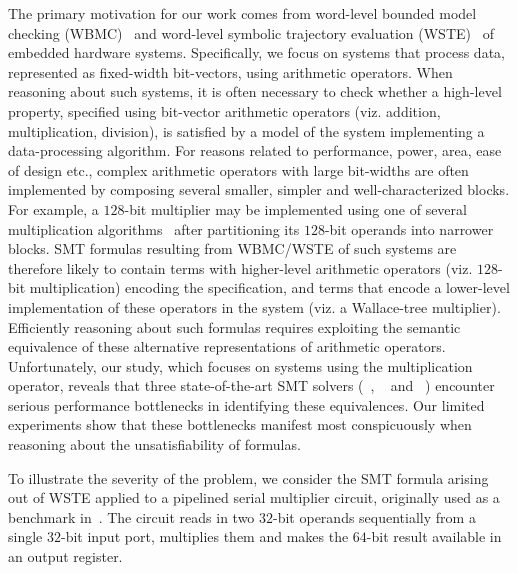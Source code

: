 The primary motivation for our work comes from word-level bounded
model checking (WBMC)~\cite{cbmc,hwcbmc} and word-level symbolic
trajectory evaluation (WSTE)~\cite{wste} of embedded hardware systems.
Specifically, we focus on systems that process data, represented as
fixed-width bit-vectors, using arithmetic operators.
When reasoning about such systems, it is often necessary to check
whether a high-level property, specified using bit-vector arithmetic
operators (viz. addition, multiplication, division), is satisfied by a
model of the system implementing a data-processing algorithm.  For
reasons related to performance, power, area, ease of design etc.,
complex arithmetic operators with large bit-widths are often
implemented by composing several smaller, simpler and
well-characterized blocks.  For example, a $128$-bit multiplier may be
implemented using one of several multiplication
algorithms~\cite{long,booth,wallace}
after partitioning its $128$-bit operands into narrower blocks.  SMT
formulas resulting from WBMC/WSTE of such systems are therefore likely
to contain terms with higher-level arithmetic operators
(viz. $128$-bit multiplication) encoding the specification, and terms
that encode a lower-level implementation of these operators in the
system (viz. a Wallace-tree multiplier).  Efficiently reasoning about
such formulas requires exploiting the semantic equivalence of these
alternative representations of arithmetic operators.  Unfortunately,
our study, which focuses on systems using the multiplication operator,
reveals that three state-of-the-art SMT solvers
({\zthree}~\cite{zthree}, {\cvcfour}~\cite{cvcfour} and
{\boolector}~\cite{boolector}) encounter serious performance
bottlenecks in identifying these equivalences.  Our limited
experiments show that these bottlenecks manifest most conspicuously
when reasoning about the unsatisfiability of formulas.

 To illustrate
the severity of the problem, we consider the SMT formula arising out
of WSTE applied to a pipelined serial multiplier circuit, originally
used as a benchmark in~\cite{wste}.  The circuit reads in two $32$-bit
operands sequentially from a single $32$-bit input port, multiplies
them and makes the $64$-bit result available in an output register.

